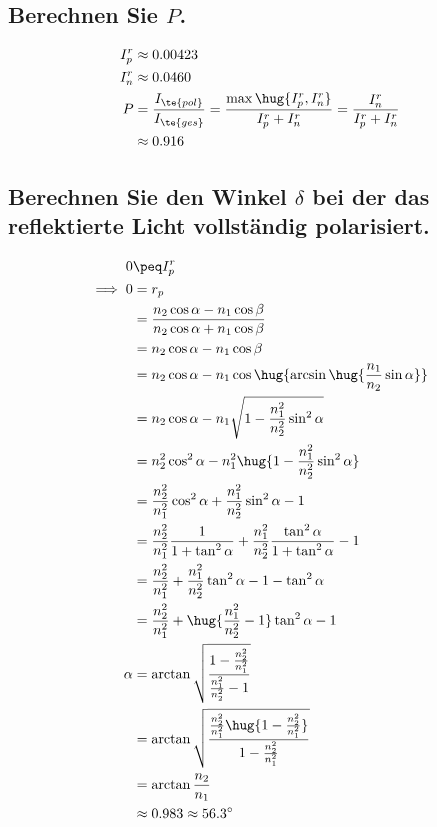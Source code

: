 \documentclass[ex]{exercise}
\begin{document}
\subsection{Berechnen Sie \(P\).}
\begin{align*}
    I_p^r  &\approx 0.00423\\
    I_n^r  &\approx 0.0460\\
    P &= \frac{I_{\te{pol}}}{I_{\te{ges}}}= \frac{\max\hug{I_p^r,I_n^r}}{I_p^r+I_n^r}= \frac{I_n^r}{I_p^r + I_n^r}\\
    &\approx 0.916
\end{align*}

\subsection{Berechnen Sie den Winkel \(\delta\) bei der das reflektierte Licht vollständig polarisiert.}
\begin{align*}
    0 &\peq I_p^r\\
    \implies 0&= r_p\\
    &= \frac{n_2\cos\alpha - n_1\cos\beta}{n_2\cos\alpha + n_1\cos\beta}\\
    &= n_2\cos\alpha - n_1\cos\beta\\
    &= n_2\cos\alpha - n_1\cos\hug{\arcsin\hug{\frac{n_1}{n_2}\sin\alpha}}\\
    &= n_2\cos\alpha - n_1\sqrt{1- \frac{n_1^2}{n_2^2}\sin^2\alpha}\\
    &= n_2^2\cos^2\alpha - n_1^2\hug{1- \frac{n_1^2}{n_2^2}\sin^2\alpha}\\
    &= \frac{n_2^2}{n_1^2}\cos^2\alpha + \frac{n_1^2}{n_2^2}\sin^2\alpha - 1\\
    &= \frac{n_2^2}{n_1^2}\frac{1}{1+ \tan^2\alpha} + \frac{n_1^2}{n_2^2}\frac{\tan^2\alpha}{1+ \tan^2\alpha} - 1\\
    &= \frac{n_2^2}{n_1^2} + \frac{n_1^2}{n_2^2}\tan^2\alpha - 1 - \tan^2\alpha\\
    &= \frac{n_2^2}{n_1^2} + \hug{\frac{n_1^2}{n_2^2}-1}\tan^2\alpha - 1\\
    \alpha &= \arctan\sqrt{\frac{1 - \frac{n_2^2}{n_1^2}}{\frac{n_1^2}{n_2^2} - 1}}\\
    &= \arctan\sqrt{\frac{\frac{n_2^2}{n_1^2}\hug{1 - \frac{n_2^2}{n_1^2}}}{1 - \frac{n_2^2}{n_1^2}}}\\
    &=\arctan \frac{n_2}{n_1}\\
    &\approx 0.983 \approx 56.3 ^\circ
\end{align*}
\end{document}
